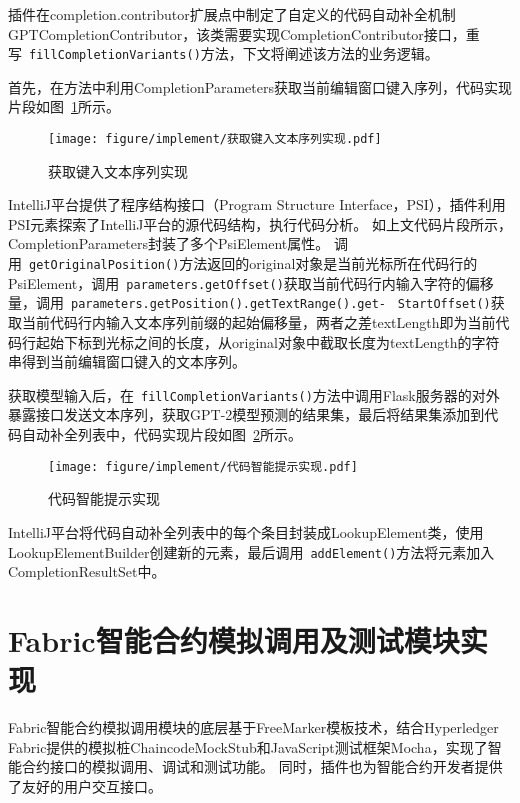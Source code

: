 插件在completion.contributor扩展点中制定了自定义的代码自动补全机制GPTCompletionContributor，该类需要实现CompletionContributor接口，重写~\texttt{fillCompletionVariants()}方法，下文将阐述该方法的业务逻辑。

首先，在方法中利用CompletionParameters获取当前编辑窗口键入序列，代码实现片段如图~\ref{fig:5.14}所示。

\begin{figure}[htb]
  \centering
  \texttt{[image: figure/implement/获取键入文本序列实现.pdf]}
  \caption{获取键入文本序列实现}\label{fig:5.14}
\end{figure}

IntelliJ平台提供了程序结构接口（Program Structure Interface，PSI），插件利用PSI元素探索了IntelliJ平台的源代码结构，执行代码分析。
如上文代码片段所示，CompletionParameters封装了多个PsiElement属性。
调用~\texttt{getOriginalPosition()}方法返回的original对象是当前光标所在代码行的PsiElement，调用~\texttt{parameters.getOffset()}获取当前代码行内输入字符的偏移量，调用~\texttt{parameters.getPosition().getTextRange().get-} \linebreak ~\texttt{StartOffset()}获取当前代码行内输入文本序列前缀的起始偏移量，两者之差textLength即为当前代码行起始下标到光标之间的长度，从original对象中截取长度为textLength的字符串得到当前编辑窗口键入的文本序列。

获取模型输入后，在~\texttt{fillCompletionVariants()}方法中调用Flask服务器的对外暴露接口发送文本序列，获取GPT-2模型预测的结果集，最后将结果集添加到代码自动补全列表中，代码实现片段如图~\ref{fig:5.15}所示。

\begin{figure}[htb]
  \centering
  \texttt{[image: figure/implement/代码智能提示实现.pdf]}
  \caption{代码智能提示实现}\label{fig:5.15}
\end{figure}

IntelliJ平台将代码自动补全列表中的每个条目封装成LookupElement类，使用LookupElementBuilder创建新的元素，最后调用~\texttt{addElement()}方法将元素加入CompletionResultSet中。

\section{Fabric智能合约模拟调用及测试模块实现}

Fabric智能合约模拟调用模块的底层基于FreeMarker模板技术，结合Hyperledger Fabric提供的模拟桩ChaincodeMockStub和JavaScript测试框架Mocha，实现了智能合约接口的模拟调用、调试和测试功能。
同时，插件也为智能合约开发者提供了友好的用户交互接口。

